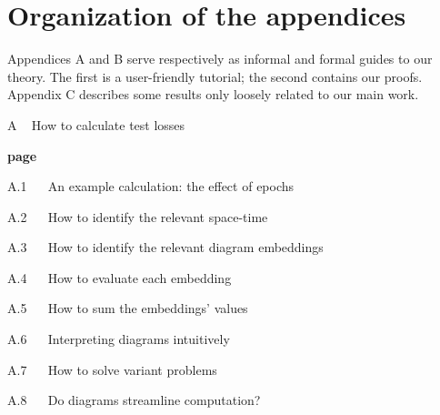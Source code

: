 \documentclass[openany, notitlepage, justified]{tufte-book}
\theoremstyle{plain}
\theoremstyle{definition}
\begin{document}
\setcounter{chapter}{0}

\chapter*{Organization of the appendices}
    Appendices A and B serve respectively as informal and formal
    guides to our theory.  The first is a user-friendly tutorial; the second
    contains our proofs.  Appendix C describes some results only loosely
    related to our main work.\\

    {\bf
    \par\noindent A ~ How to calculate test losses}                         \hfill {\bf page \pageref{appendix:tutorial}}
    \par\indent     A.1 ~~ An example calculation: the effect of epochs     \hfill \pageref{appendix:example}
    \par\indent     A.2 ~~ How to identify the relevant space-time          \hfill \pageref{appendix:draw-spacetime} 
    \par\indent     A.3 ~~ How to identify the relevant diagram embeddings  \hfill \pageref{appendix:draw-embeddings}
    \par\indent     A.4 ~~ How to evaluate each embedding                   \hfill \pageref{appendix:evaluate-embeddings}
    \par\indent     A.5 ~~ How to sum the embeddings' values                \hfill \pageref{appendix:sum-embeddings}
    \par\indent     A.6 ~~ Interpreting diagrams intuitively                \hfill \pageref{appendix:interpret-diagrams}
    \par\indent     A.7 ~~ How to solve variant problems                    \hfill \pageref{appendix:solve-variants}
    \par\indent     A.8 ~~ Do diagrams streamline computation?              \hfill \pageref{appendix:diagrams-streamline}
\end{document}
